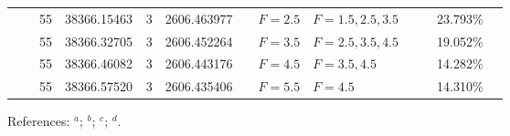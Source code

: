 \begin{table*}
\begin{center}
{\begin{tabular}{:l;l;c;l;c;l;c;l;l;c;c;c;c}
\rowstyle{\itshape}               &        & 55        & 38366.15463$^{}$                 & 3 &   2606.463977      &      & $F=2.5                                   $ & $F=1.5,2.5,3.5                           $ &             &              & 23.793\%  & $     ^{}     $\\
\rowstyle{\itshape}               &        & 55        & 38366.32705$^{}$                 & 3 &   2606.452264      &      & $F=3.5                                   $ & $F=2.5,3.5,4.5                           $ &             &              & 19.052\%  & $     ^{}     $\\
\rowstyle{\itshape}               &        & 55        & 38366.46082$^{}$                 & 3 &   2606.443176      &      & $F=4.5                                   $ & $F=3.5,4.5                               $ &             &              & 14.282\%  & $     ^{}     $\\
\rowstyle{\itshape}               &        & 55        & 38366.57520$^{}$                 & 3 &   2606.435406      &      & $F=5.5                                   $ & $F=4.5                                   $ &             &              & 14.310\%  & $     ^{}     $\\
\hline
\end{tabular}
}
{\footnotesize References:
$^{a}$\citet{Aldenius:2009:014008};
$^{b}$\citet{Blackwell-Whitehead:2005:705};
$^{c}$\citet{Nave:2012:1570};
$^{d}$\citet{Berengut:2004:064101}.}
\end{center}
\end{table*}
